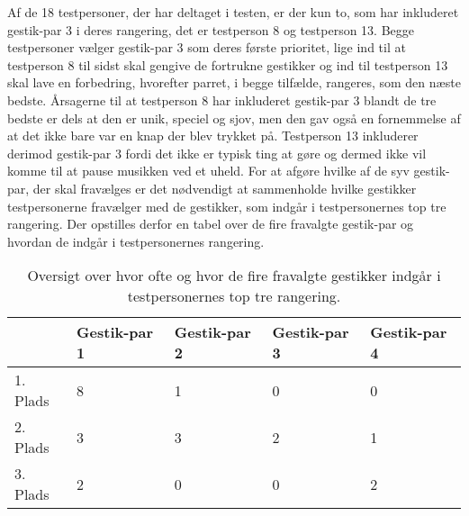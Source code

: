 Af de 18 testpersoner, der har deltaget i testen, er der kun to, som har inkluderet gestik-par 3 i deres rangering, det er testperson 8 og testperson 13. Begge testpersoner vælger gestik-par 3 som deres første prioritet, lige ind til at testperson 8 til sidst skal gengive de fortrukne gestikker og ind til testperson 13 skal lave en forbedring, hvorefter parret, i begge tilfælde, rangeres, som den næste bedste. Årsagerne til at testperson 8 har inkluderet gestik-par 3 blandt de tre bedste er dels at den er unik, speciel og sjov, men den gav også en fornemmelse af at det ikke bare var en knap der blev trykket på. Testperson 13 inkluderer derimod gestik-par 3 fordi det ikke er typisk ting at gøre og dermed ikke vil komme til at pause musikken ved et uheld.\blankline
%
For at afgøre hvilke af de syv gestik-par, der skal fravælges er det nødvendigt at sammenholde hvilke gestikker testpersonerne fravælger med de gestikker, som indgår i testpersonernes top tre rangering. Der opstilles derfor en tabel over de fire fravalgte gestik-par og hvordan de indgår i testpersonernes rangering.
%
\begin{table}[H]
	\centering
	\begin{tabular}{ | p{2.2cm} | p{2.2cm} | p{2.2cm} | p{2.2cm} | p{2.2cm} |}
	\hline
		 & Gestik-par 1 & Gestik-par 2 & Gestik-par 3 & Gestik-par 4 \\ \hline
		1. Plads & 8 & 1 & 0 & 0\\ \hline
		2. Plads & 3 & 3 & 2 & 1\\ \hline
		3. Plads & 2 & 0 & 0 & 2\\ \hline
	\end{tabular}
	\caption{Oversigt over hvor ofte og hvor de fire fravalgte gestikker indgår i testpersonernes top tre rangering.}
	\label{tab:FravalgteTopTrePause}
\end{table}
\noindent
%
